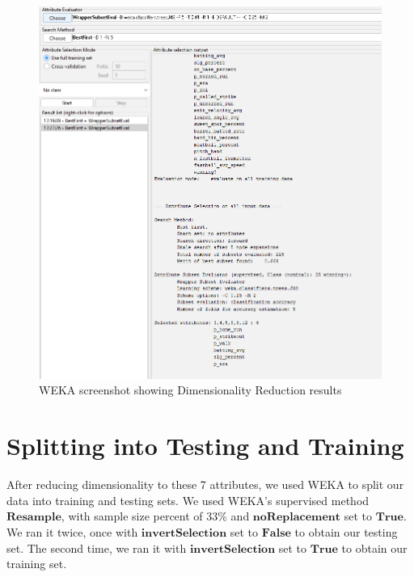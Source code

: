 \documentclass[12pt]{article}
\begin{document}
\begin{figure}[h!]
    \includegraphics[scale=0.55]{DimRed.png}
    \caption{WEKA screenshot showing Dimensionality Reduction results}
    \label{fig:DimRed}
\end{figure}

\section{Splitting into Testing and Training}
After reducing dimensionality to these 7 attributes, we used WEKA to split our data into training and testing sets. We used WEKA's supervised method $\textbf{Resample}$, with sample size percent of 33\% and $\textbf{noReplacement}$ set to $\textbf{True}$. We ran it twice, once with $\textbf{invertSelection}$ set to $\textbf{False}$ to obtain our testing set. 
The second time, we ran it with $\textbf{invertSelection}$ set to $\textbf{True}$ to obtain our training set. 
\end{document}
